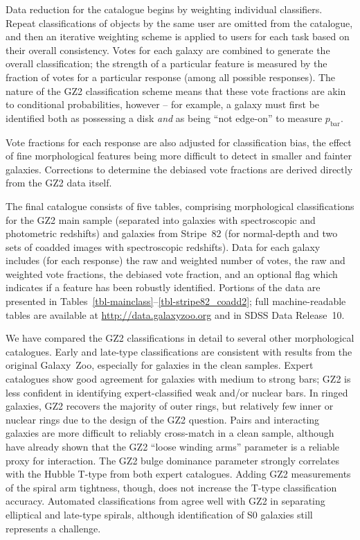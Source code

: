 \documentclass[useAMS,usenatbib]{mn2e}
\begin{document}
Data reduction for the catalogue begins by weighting individual classifiers. Repeat classifications of objects by the same user are omitted from the catalogue, and then an iterative weighting scheme is applied to users for each task based on their overall consistency. Votes for each galaxy are combined to generate the overall classification; the strength of a particular feature is measured by the fraction of votes for a particular response (among all possible responses). The nature of the GZ2 classification scheme means that these vote fractions are akin to conditional probabilities, however -- for example, a galaxy must first be identified both as possessing a disk {\em and} as being ``not edge-on'' to measure $p_\mathrm{bar}$.

Vote fractions for each response are also adjusted for classification bias, the effect of fine morphological features being more difficult to detect in smaller and fainter galaxies. Corrections to determine the debiased vote fractions are derived directly from the GZ2 data itself. 

The final catalogue consists of five tables, comprising morphological classifications for the GZ2 main sample (separated into galaxies with spectroscopic and photometric redshifts) and galaxies from Stripe~82 (for normal-depth and two sets of coadded images with spectroscopic redshifts). Data for each galaxy includes (for each response) the raw and weighted number of votes, the raw and weighted vote fractions, the debiased vote fraction, and an optional flag which indicates if a feature has been robustly identified. Portions of the data are presented in Tables~\ref{tbl-mainclass}--\ref{tbl-stripe82_coadd2}; full machine-readable tables are available at \url{http://data.galaxyzoo.org} and in SDSS Data Release~10. 

We have compared the GZ2 classifications in detail to several other morphological catalogues. Early and late-type classifications are consistent with results from the original Galaxy~Zoo, especially for galaxies in the clean samples. Expert catalogues \citep{nai10,bai11} show good agreement for galaxies with medium to strong bars; GZ2 is less confident in identifying expert-classified weak and/or nuclear bars. In ringed galaxies, GZ2 recovers the majority of outer rings, but relatively few inner or nuclear rings due to the design of the GZ2 question. Pairs and interacting galaxies are more difficult to reliably cross-match in a clean sample, although \citet{cas13} have already shown that the GZ2 ``loose winding arms'' parameter is a reliable proxy for interaction. The GZ2 bulge dominance parameter strongly correlates with the Hubble T-type from both expert catalogues. Adding GZ2 measurements of the spiral arm tightness, though, does not increase the T-type classification accuracy. Automated classifications from \citet{hue11} agree well with GZ2 in separating elliptical and late-type spirals, although identification of S0 galaxies still represents a challenge. 
\end{document}
